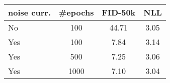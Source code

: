 \begin{tabular}{lccc}
\toprule
noise curr. &
\#epochs &
FID-50k &
NLL \\
\midrule
No &
100 &
44.71 &
3.05 \\
Yes &
100 &
7.84 &
3.14 \\
Yes &
500 &
7.25 &
3.06 \\
Yes &
1000 &
7.10 &
3.04 \\
\bottomrule
\end{tabular}